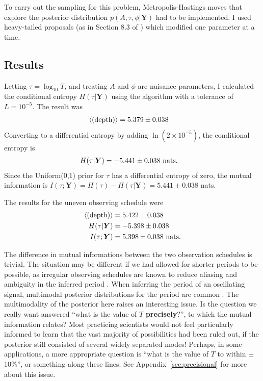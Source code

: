 \documentclass[entropy,article,accept,oneauthor,pdftex,10pt,a4paper]{mdpi}
\newcommand{\depth}{(\textnormal{depth})}
\begin{document}
To carry out the sampling for this problem, Metropolis-Hastings moves that
explore the posterior distribution $p(A, \tau, \phi | \boldsymbol{Y})$
had to be implemented. I used heavy-tailed proposals (as in
Section 8.3 of \citet{dnest4}) which modified one parameter at a time.

\subsection{Results}

Letting $\tau = \log_{10} T$, and treating
$A$ and $\phi$ are nuisance parameters, I calculated the conditional entropy
$H(\tau | \boldsymbol{Y})$ using the algorithm with a tolerance of $L = 10^{-5}$.
The result was
\begin{align}
\left<\depth\right> &= 5.379 \pm 0.038
\end{align}
Converting to a differential entropy by adding $\ln (2 \times 10^{-5})$, the conditional
entropy is
\begin{align}
H(\tau | \boldsymbol{Y}) &= -5.441 \pm 0.038 \textnormal{ nats}.
\end{align}
Since the Uniform(0,1) prior for $\tau$ has a differential entropy of zero, the
mutual information is $I(\tau; \boldsymbol{Y}) = H(\tau) - H(\tau | \boldsymbol{Y}) = 5.441 \pm 0.038$
nats.

The results for the uneven observing schedule were
\begin{align}
\left<\depth\right>       &=  5.422 \pm 0.038 \\
H(\tau | \boldsymbol{Y}) &= -5.398 \pm 0.038 \\
I(\tau; \boldsymbol{Y})   &=  5.398 \pm 0.038 \textnormal{ nats}.
\end{align}

The difference in mutual informations between the two observation
schedules is trivial.
The situation may be different if we
had allowed for shorter periods to be possible, as irregular observing
schedules are known to reduce aliasing and ambiguity in the inferred period
\citep{bretthorst2001nonuniform}.
When inferring the period of an oscillating signal, multimodal posterior
distributions for the period are common \citep{gregoryTrimodal, exoplanet}.
The multimodality of the posterior here raises an interesting issue. Is
the question we really want answered ``what is the value of $T$
{\bf precisely}?'', to which the mutual information relates?
Most practicing scientists would not feel particularly informed to learn
that the vast majority of possibilities had been ruled out, if the
posterior still consisted of several widely separated modes!
Perhaps, in some applications, a more appropriate question is
``what is the value of $T$ to within $\pm$ 10\%'', or something along these
lines. See Appendix~\ref{sec:precisional} for more about this
issue.
\end{document}
